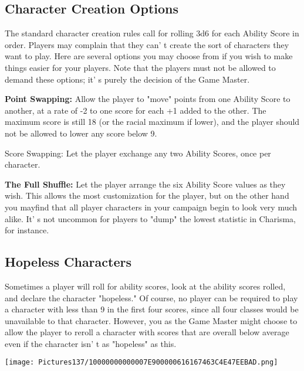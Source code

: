 \documentclass[a4paper,twoside,openany,10pt]{book}
\begin{document}
\begin{multicols}{2}


\subsection{Character Creation Options}\label{character-creation-options}

The standard character creation rules call for rolling 3d6 for each Ability Score in order. Players may complain that they can' t create the sort of characters they want to play. Here are several options you may choose from if you wish to make things easier for your players. Note that the players must not be allowed to demand these options; it' s purely the decision of the Game Master.

\textbf{Point Swapping:} Allow the player to "move" points from one Ability Score to another, at a rate of -2 to one score for each +1 added to the other. The maximum score is still 18 (or the racial maximum if lower), and the player should not be allowed to lower any score below 9. 

Score Swapping: Let the player exchange any two Ability Scores, once per character.

\textbf{The Full Shuffle:} Let the player arrange the six Ability Score values as they wish. This allows the most customization for the player, but on the other hand you mayfind that all player characters in your  campaign begin to look very much alike. It' s not uncommon for players to "dump" the lowest statistic in Charisma, for instance.

\subsection{Hopeless Characters}\label{hopeless-characters}

Sometimes a player will roll for ability scores, look at the ability scores rolled, and declare the character "hopeless." Of course, no player can be required to play a character with less than 9 in the first four scores, since all four classes would be unavailable to that character. However, you as the Game Master might choose to allow the player to reroll a character with scores that are overall below average even if the character isn' t as "hopeless" as this.

\begin{center}

\texttt{[image: Pictures137/10000000000007E900000616167463C4E47EEBAD.png]}  
\end{center}


\end{multicols}
\end{document}
